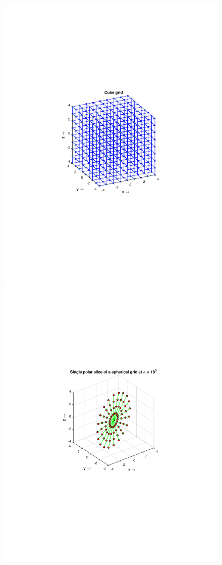 \documentclass{UCF_ETD}
\begin{document}
 \begin{figure}[H]
 \begin{center}
 \includegraphics[scale=0.6]{PolarSphericalDFT/CubeGrid}
 \includegraphics[scale=0.6]{PolarSphericalDFT/Single18PolarGrid}

\end{center}
\end{figure}
\end{document}
